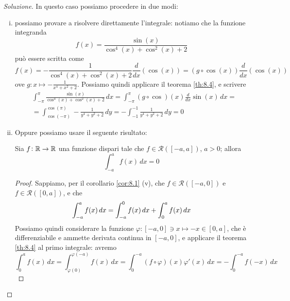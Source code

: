 \begin{proof}[Soluzione]
    In questo caso possiamo procedere in due modi: 
    \begin{enumerate}[(i)]
        \item possiamo provare a risolvere direttamente l'integrale: notiamo che la funzione integranda
        \[
        f(x) = \frac{\sin(x)}{\cos^4(x)+\cos^2(x)+2}
        \]
        può essere scritta come
        \[
        f(x) = -\frac{1}{\cos^4(x)+\cos^2(x)+2}\frac{d}{dx}(\cos(x)) = (g \circ \cos(x))\frac{d}{dx}(\cos(x))
        \]
        ove $g\colon x \mapsto -\frac{1}{x^4+x^2+2}$. Possiamo quindi applicare il teorema \ref{th:8.4}, e scrivere
        \[
        \begin{split}
            &\int_{-\pi}^\pi  \frac{\sin(x)}{\cos^4(x)+\cos^2(x)+2}\, dx = \int_{-\pi}^\pi (g\circ \cos)(x) \frac{d}{dx}\sin(x)\, dx = \\
            & = \int_{\cos(-\pi)}^{\cos(\pi)}-\frac{1}{y^4+y^2+2}\, dy = -\int_{-1}^{-1} \frac{1}{y^4+y^2+2}\, dy = 0
        \end{split}
        \]   
        \item Oppure possiamo usare il seguente risultato:
        \begin{tcolorbox}
            \begin{proposition}
                \label{prop:8.1}
                Sia $f\colon\amsbb{R}\to \amsbb{R}$ una funzione dispari tale che $f\in\mathscr{R}([-a,a])$, $a>0$; allora
                \[
                \int_{-a}^a f(x)\, dx = 0
                \]
            \end{proposition}
            \begin{proof}
                Sappiamo, per il corollario \ref{cor:8.1} (v), che $f\in\mathscr{R}([-a,0])$ e $f\in\mathscr{R}([0,a])$, e che
                \vspace{-0.2cm}
                \[
                \int_{-a}^a f(x)\, dx = \int_{-a}^0 f(x)\, dx + \int_0^a f(x)\, dx
                \vspace{-0.2cm}
                \]
                Possiamo quindi considerare la funzione $\varphi\colon [-a,0]\ni x \mapsto -x\in[0,a]$, che è differenziabile e ammette derivata continua in $[-a,0]$, e applicare il teorema \ref{th:8.4} al primo integrale: avremo
                \vspace{-0.2cm}
                \[
                \int_{0}^a f(x)\, dx = \int_{\varphi(0)}^{\varphi(-a)}f(x)\, dx =  \int_{0}^{-a} (f \circ \varphi)(x) \varphi'(x)\, dx = -\int_{0}^{-a} f(-x)\, dx
\]
\end{proof}
\end{tcolorbox}
\end{enumerate}
\end{proof}
